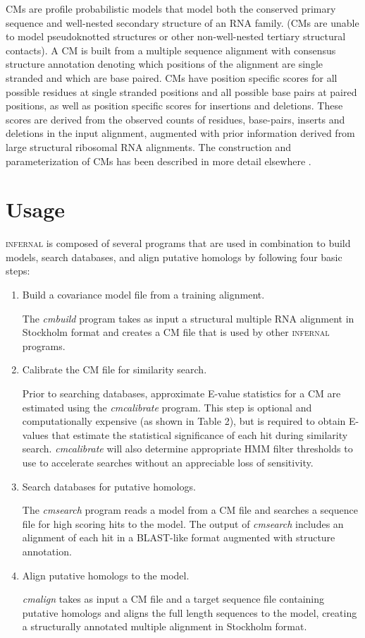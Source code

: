 \documentclass[11pt]{article}
\begin{document}
CMs are profile probabilistic models that model both the conserved
primary sequence and well-nested secondary structure of an RNA family.
(CMs are unable to model pseudoknotted structures or other
non-well-nested tertiary structural contacts). A CM is built from a
multiple sequence alignment with consensus structure annotation
denoting which positions of the alignment are single stranded and
which are base paired. CMs have position specific scores for all
possible residues at single stranded positions and all possible base
pairs at paired positions, as well as position specific scores for
insertions and deletions. These scores are derived from the observed
counts of residues, base-pairs, inserts and deletions in the input
alignment, augmented with prior information derived from large
structural ribosomal RNA alignments. The construction and
parameterization of CMs has been described in more detail elsewhere
\cite{Eddy94,infguide03,Eddy02b,NawrockiEddy07}.

\section{Usage} 
\textsc{infernal} is composed of several programs that are used in
combination to build models, search databases, and align putative
homologs by following four basic steps:

\begin{enumerate}
\item Build a covariance model file from a training alignment.

The \emph{cmbuild} program takes as input a structural multiple
RNA alignment in Stockholm format \cite{infguide03} and creates a CM
file that is used by other \textsc{infernal} programs.

\item Calibrate the CM file for similarity search.

Prior to searching databases, approximate E-value statistics for a CM
are estimated using the \emph{cmcalibrate} program. This step is
optional and computationally expensive (as shown in Table 2), but is
required to obtain E-values that estimate the statistical significance
of each hit during similarity search. \emph{cmcalibrate} will also
determine appropriate HMM filter thresholds to use to accelerate
searches without an appreciable loss of sensitivity.

\item Search databases for putative homologs.

The \emph{cmsearch} program reads a model from a CM file and searches
a sequence file for high scoring hits to the model. The output of
\emph{cmsearch} includes an alignment of each hit in a BLAST-like
format augmented with structure annotation.  

\item Align putative homologs to the model.

\emph{cmalign} takes as input a CM file and a target sequence file 
containing putative homologs and aligns the full length sequences to
the model, creating a structurally annotated multiple alignment in
Stockholm format.

\end{enumerate}
\end{document}
